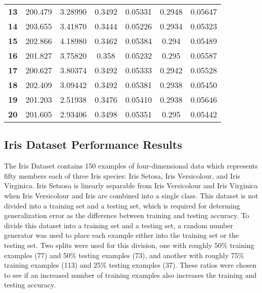 \begin{table}[h!]
\begin{center}
\begin{tabular}{l|c|c|c|c|c|c}
  \textbf{13} & 200.479 & 3.28990 & 0.3492 & 0.05331 & 0.2948 & 0.05647\\
  \textbf{14} & 203.655 & 3.41870 & 0.3444 & 0.05226 & 0.2934 & 0.05323\\
  \textbf{15} & 202.866 & 4.18980 & 0.3462 & 0.05384 & 0.294 & 0.05489\\
  \textbf{16} & 201.827 & 3.75820 & 0.358 & 0.05232 & 0.295 & 0.05587\\
  \textbf{17} & 200.627 & 3.80374 & 0.3492 & 0.05333 & 0.2942 & 0.05528\\
  \textbf{18} & 202.409 & 3.09442 & 0.3492 & 0.05381 & 0.2938 & 0.05450\\
  \textbf{19} & 201.203 & 2.51938 & 0.3476 & 0.05410 & 0.2938 & 0.05646\\
  \textbf{20} & 201.605 & 2.93406 & 0.3498 & 0.05351 & 0.295 & 0.05442\\
  \end{tabular}
 \end{center}
\end{table}

\subsection{Iris Dataset Performance Results}\label{IrisResults}
The Iris Dataset \cite{Fis36} contains 150 examples of four-dimensional data which represents fifty members each of three Iris species: Iris Setosa, Iris Versicolour, and Iris Virginica. Iris Setsosa is linearly separable from Iris Versicolour and Iris Virginica when Iris Versicolour and Iris are combined into a single class. This dataset is not divided into a training set and a testing set, which is required for determing generalization error as the difference between training and testing accuracy. To divide this dataset into a training set and a testing set, a random number generator was used to place each example either into the training set or the testing set. Two splits were used for this division, one with roughly 50\% training examples (77) and 50\% testing examples (73), and another with roughly 75\% training examples (113) and 25\% testing examples (37). These ratios were chosen to see if an increased number of training examples also increases the training and testing accuracy.

